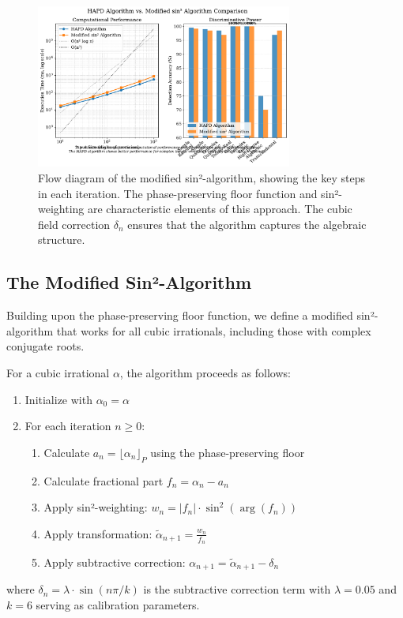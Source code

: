 \begin{figure}[p]
\vspace*{2cm}
\begin{minipage}{\textwidth}
\centering
\includegraphics[width=0.75\textwidth]{figures/sin2_algorithm_flow.pdf}

\vspace{1.5cm}
\caption{Flow diagram of the modified sin²-algorithm, showing the key steps in each iteration. The phase-preserving floor function and sin²-weighting are characteristic elements of this approach. The cubic field correction $\delta_n$ ensures that the algorithm captures the algebraic structure.}
\label{fig:sin2_algorithm}
\end{minipage}
\vspace{2cm}
\end{figure}
\clearpage

\subsection{The Modified Sin²-Algorithm}

Building upon the phase-preserving floor function, we define a modified sin²-algorithm that works for all cubic irrationals, including those with complex conjugate roots.

\begin{algorithm_def}
For a cubic irrational $\alpha$, the algorithm proceeds as follows:
\begin{enumerate}
    \item Initialize with $\alpha_0 = \alpha$
    \item For each iteration $n \geq 0$:
    \begin{enumerate}
        \item Calculate $a_n = \lfloor \alpha_n \rfloor_P$ using the phase-preserving floor
        \item Calculate fractional part $f_n = \alpha_n - a_n$
        \item Apply sin²-weighting: $w_n = |f_n| \cdot \sin^2(\arg(f_n))$
        \item Apply transformation: $\tilde{\alpha}_{n+1} = \frac{w_n}{f_n}$
        \item Apply subtractive correction: $\alpha_{n+1} = \tilde{\alpha}_{n+1} - \delta_n$
    \end{enumerate}
\end{enumerate}
where $\delta_n = \lambda \cdot \sin(n\pi/k)$ is the subtractive correction term with $\lambda = 0.05$ and $k = 6$ serving as calibration parameters.
\end{algorithm_def}

